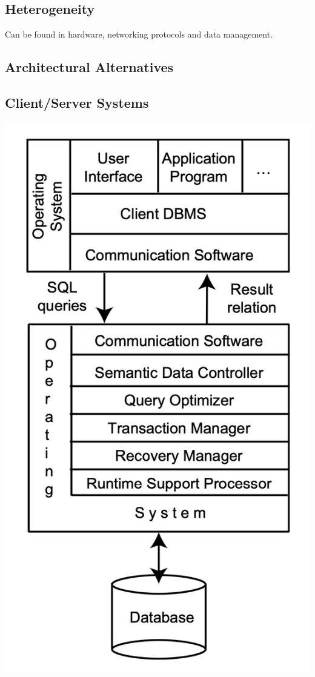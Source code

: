 \documentclass[12pt]{article}
\begin{document}
\subsection{Heterogeneity}

Can be found in hardware, networking protocols and data management.

\subsection{Architectural Alternatives}

\subsection{Client/Server Systems}

\includegraphics[scale=0.5, center]{assets/client-server-architecture.png}	
\end{document}
